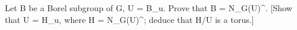 Let B be a Borel subgroup of G, U = B_u. Prove that B = N_G(U)^\circ. [Show that U = H_u, where H = N_G(U)^\circ; deduce that H/U is a torus.]
